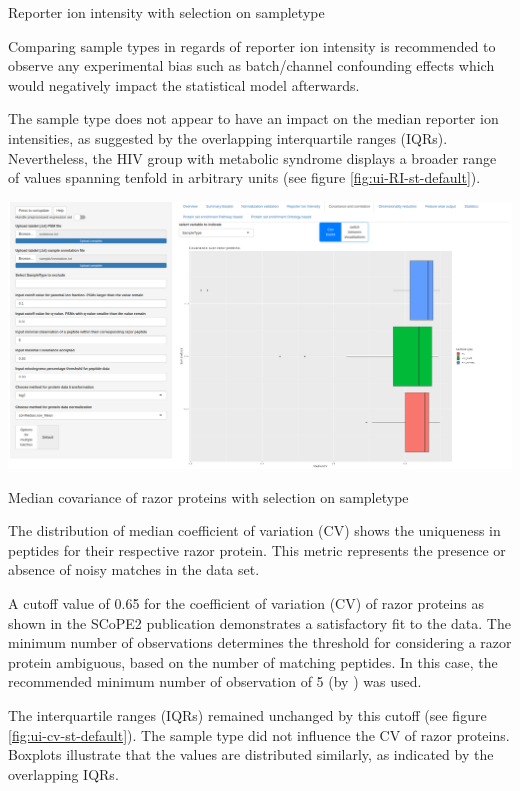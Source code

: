 \documentclass[
  11pt,
]{article}
\let\origfigure\figure
\begin{document}
\caption{Reporter ion intensity with selection on sampletype}\label{fig:ui-RI-st-default}
 \endfigure\egroup

Comparing sample types in regards of reporter ion intensity is recommended to observe any experimental bias such as batch/channel confounding effects which would negatively impact the statistical model afterwards.

The sample type does not appear to have an impact on the median reporter ion intensities, as suggested by the overlapping interquartile ranges (IQRs). Nevertheless, the HIV group with metabolic syndrome displays a broader range of values spanning tenfold in arbitrary units (see figure \ref{fig:ui-RI-st-default}).

\newpage
\bgroup  \origfigure[H] 

{\centering \includegraphics[width=1\linewidth]{screenshots/cv_st_default} 

}

\caption{Median covariance of razor proteins with selection on sampletype}\label{fig:ui-cv-st-default}
 \endfigure\egroup

The distribution of median coefficient of variation (CV) shows the uniqueness in peptides for their respective razor protein. This metric represents the presence or absence of noisy matches in the data set.

A cutoff value of 0.65 for the coefficient of variation (CV) of razor proteins as shown in the SCoPE2 publication \citep{Specht2021} demonstrates a satisfactory fit to the data. The minimum number of observations determines the threshold for considering a razor protein ambiguous, based on the number of matching peptides. In this case, the recommended minimum number of observation of 5 (by \citep{Specht2021}) was used.

The interquartile ranges (IQRs) remained unchanged by this cutoff (see figure \ref{fig:ui-cv-st-default}). The sample type did not influence the CV of razor proteins. Boxplots illustrate that the values are distributed similarly, as indicated by the overlapping IQRs.
\end{document}
